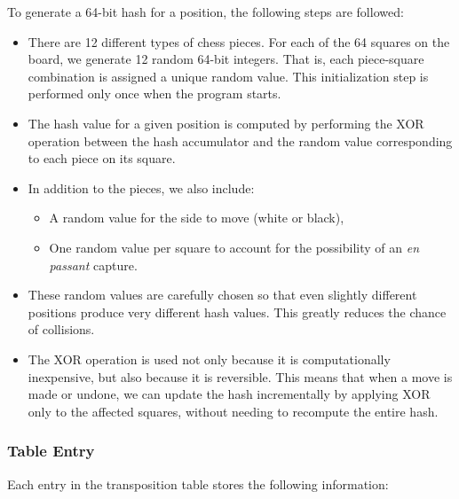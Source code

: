 To generate a 64-bit hash for a position, the following steps are followed:\\

\begin{itemize}
  \item There are 12 different types of chess pieces. For each of the 64 squares on the board, we generate 12 random 64-bit integers. That is, each piece-square combination is assigned a unique random value. This initialization step is performed only once when the program starts.
  
  \item The hash value for a given position is computed by performing the XOR operation between the hash accumulator and the random value corresponding to each piece on its square.
  
  \item In addition to the pieces, we also include:
  \begin{itemize}
    \item A random value for the side to move (white or black),
    \item One random value per square to account for the possibility of an \textit{en passant} capture.
  \end{itemize}
  
  \item These random values are carefully chosen so that even slightly different positions produce very different hash values. This greatly reduces the chance of collisions.
  
  \item The XOR operation is used not only because it is computationally inexpensive, but also because it is reversible. This means that when a move is made or undone, we can update the hash incrementally by applying XOR only to the affected squares, without needing to recompute the entire hash.
\end{itemize}

\subsubsection{Table Entry}

Each entry in the transposition table stores the following information:

